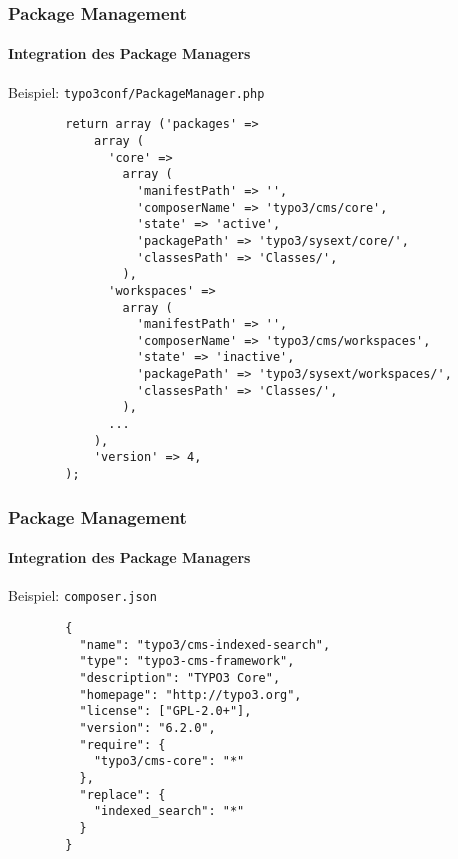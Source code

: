 \begin{frame}[fragile]
	\frametitle{Package Management}
	\framesubtitle{Integration des Package Managers}

	Beispiel: \texttt{typo3conf/PackageManager.php}

	\lstset{
		basicstyle=\tiny\ttfamily
	}

	\begin{lstlisting}
		return array ('packages' =>
		    array (
		      'core' =>
		        array (
		          'manifestPath' => '',
		          'composerName' => 'typo3/cms/core',
		          'state' => 'active',
		          'packagePath' => 'typo3/sysext/core/',
		          'classesPath' => 'Classes/',
		        ),
		      'workspaces' =>
		        array (
		          'manifestPath' => '',
		          'composerName' => 'typo3/cms/workspaces',
		          'state' => 'inactive',
		          'packagePath' => 'typo3/sysext/workspaces/',
		          'classesPath' => 'Classes/',
		        ),
		      ...
		    ),
		    'version' => 4,
		);
	\end{lstlisting}

\end{frame}


\begin{frame}[fragile]
	\frametitle{Package Management}
	\framesubtitle{Integration des Package Managers}

	Beispiel: \texttt{composer.json}

	\lstset{
		basicstyle=\tiny\ttfamily
	}

	\begin{lstlisting}
		{
		  "name": "typo3/cms-indexed-search",
		  "type": "typo3-cms-framework",
		  "description": "TYPO3 Core",
		  "homepage": "http://typo3.org",
		  "license": ["GPL-2.0+"],
		  "version": "6.2.0",
		  "require": {
		    "typo3/cms-core": "*"
		  },
		  "replace": {
		    "indexed_search": "*"
		  }
		}
	\end{lstlisting}

\end{frame}


